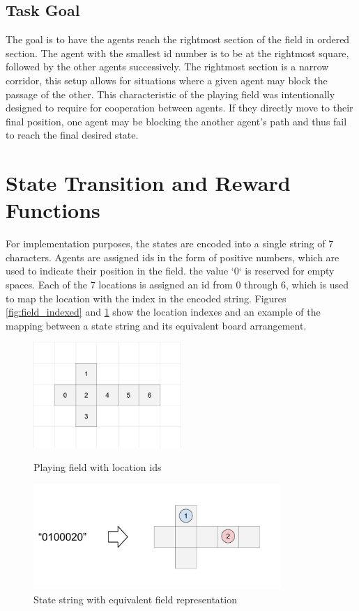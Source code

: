 \documentclass[11pt]{article}
\begin{document}
\subsection{Task Goal}
    The goal is to have the agents reach the rightmost section of the field in ordered section. The agent with the smallest id number is to be at the rightmost square, followed by the other agents successively. The rightmost section is a narrow corridor, this setup allows for situations where a given agent may block the passage of the other. This characteristic of the playing field was intentionally designed to require for cooperation between agents. If they directly move to their final position, one agent may be blocking the another agent's path and thus fail to reach the final desired state.



\section{State Transition and Reward Functions} \label{sec:transition}
    For implementation purposes, the states are encoded into a single string of 7 characters. Agents are assigned ids in the form of positive numbers, which are used to indicate their position in the field. the value `0` is reserved for empty spaces. Each of the 7 locations is assigned an id from 0 through 6, which is used to map the location with the index in the encoded string. Figures \ref{fig:field_indexed} and \ref{fig:field_mapping} show the location indexes and an example of the mapping between a state string and its equivalent board arrangement.


    \begin{figure}[h]
        \centering
        \includegraphics[height=4cm]{./Images/2_Playing_Field_Indexed.jpg}
        \caption{Playing field with location ids}
        \label{fig:field_indexed}

        \includegraphics[height=4cm]{./Images/3_Playing_Field_Encoding.jpg}
        \caption{State string with equivalent field representation}
        \label{fig:field_mapping}
    \end{figure}
\end{document}
